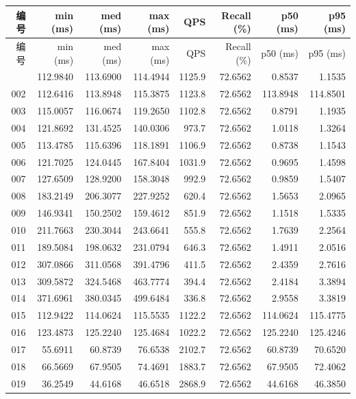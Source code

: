 \begingroup\fontsize{9.3}{11.8}\selectfont
\setlength{\tabcolsep}{4pt}
\begin{longtable}{rrrrrrrr}
\toprule
编号 & min (ms) & med (ms) & max (ms) & QPS & Recall (\%) & p50 (ms) & p95 (ms)\\\midrule\endfirsthead
\toprule
编号 & min (ms) & med (ms) & max (ms) & QPS & Recall (\%) & p50 (ms) & p95 (ms)\\\midrule\endhead
\bottomrule\endfoot
001 & 112.9840 & 113.6900 & 114.4944 & 1125.9 & 72.6562 & 0.8537 & 1.1535\\
002 & 112.6416 & 113.8948 & 115.3875 & 1123.8 & 72.6562 & 113.8948 & 114.8501\\
003 & 115.0057 & 116.0674 & 119.2650 & 1102.8 & 72.6562 & 0.8791 & 1.1935\\
004 & 121.8692 & 131.4525 & 140.0306 & 973.7 & 72.6562 & 1.0118 & 1.3264\\
005 & 113.4785 & 115.6396 & 118.1891 & 1106.9 & 72.6562 & 0.8738 & 1.1543\\
006 & 121.7025 & 124.0445 & 167.8404 & 1031.9 & 72.6562 & 0.9695 & 1.4598\\
007 & 127.6509 & 128.9200 & 158.3048 & 992.9 & 72.6562 & 0.9859 & 1.5407\\
008 & 183.2149 & 206.3077 & 227.9252 & 620.4 & 72.6562 & 1.5653 & 2.0965\\
009 & 146.9341 & 150.2502 & 159.4612 & 851.9 & 72.6562 & 1.1518 & 1.5335\\
010 & 211.7663 & 230.3044 & 243.6641 & 555.8 & 72.6562 & 1.7639 & 2.2564\\
011 & 189.5084 & 198.0632 & 231.0794 & 646.3 & 72.6562 & 1.4911 & 2.0516\\
012 & 307.0866 & 311.0568 & 391.4796 & 411.5 & 72.6562 & 2.4359 & 2.7616\\
013 & 309.5872 & 324.5468 & 463.7774 & 394.4 & 72.6562 & 2.4184 & 3.3894\\
014 & 371.6961 & 380.0345 & 499.6484 & 336.8 & 72.6562 & 2.9558 & 3.3819\\
015 & 112.9422 & 114.0624 & 115.5535 & 1122.2 & 72.6562 & 114.0624 & 115.4775\\
016 & 123.4873 & 125.2240 & 125.4684 & 1022.2 & 72.6562 & 125.2240 & 125.4246\\
017 & 55.6911 & 60.8739 & 76.6538 & 2102.7 & 72.6562 & 60.8739 & 70.6520\\
018 & 66.5669 & 67.9505 & 74.4691 & 1883.7 & 72.6562 & 67.9505 & 72.4062\\
019 & 36.2549 & 44.6168 & 46.6518 & 2868.9 & 72.6562 & 44.6168 & 46.3850\\

\end{longtable}
